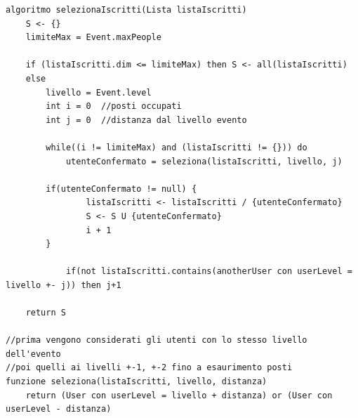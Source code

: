 \begin{lstlisting}
algoritmo selezionaIscritti(Lista listaIscritti) 
    S <- {}
    limiteMax = Event.maxPeople
    
    if (listaIscritti.dim <= limiteMax) then S <- all(listaIscritti)
    else 
        livello = Event.level
        int i = 0  //posti occupati
        int j = 0  //distanza dal livello evento
        
        while((i != limiteMax) and (listaIscritti != {})) do
            utenteConfermato = seleziona(listaIscritti, livello, j)
            
	    if(utenteConfermato != null) {
            	listaIscritti <- listaIscritti / {utenteConfermato}
            	S <- S U {utenteConfermato}
            	i + 1
	    }

            if(not listaIscritti.contains(anotherUser con userLevel = livello +- j)) then j+1
        
    return S

//prima vengono considerati gli utenti con lo stesso livello dell'evento
//poi quelli ai livelli +-1, +-2 fino a esaurimento posti
funzione seleziona(listaIscritti, livello, distanza)
    return (User con userLevel = livello + distanza) or (User con userLevel - distanza)
\end{lstlisting}

